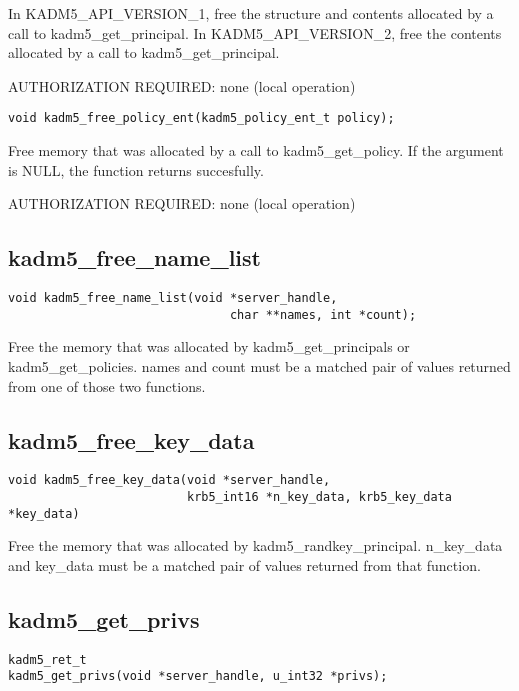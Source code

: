 In KADM5_API_VERSION_1, free the structure and contents allocated by a
call to kadm5_get_principal.  In KADM5_API_VERSION_2, free the
contents allocated by a call to kadm5_get_principal.

AUTHORIZATION REQUIRED: none (local operation)

\begin{verbatim}
void kadm5_free_policy_ent(kadm5_policy_ent_t policy);
\end{verbatim}

Free memory that was allocated by a call to kadm5_get_policy.  If
the argument is NULL, the function returns succesfully.

AUTHORIZATION REQUIRED: none (local operation)

\subsection{kadm5_free_name_list}

\begin{verbatim}
void kadm5_free_name_list(void *server_handle,
                               char **names, int *count);
\end{verbatim}

Free the memory that was allocated by kadm5_get_principals or
kadm5_get_policies.  names and count must be a matched pair of
values returned from one of those two functions.

\subsection{kadm5_free_key_data}

\begin{verbatim}
void kadm5_free_key_data(void *server_handle,
                         krb5_int16 *n_key_data, krb5_key_data *key_data)
\end{verbatim}

Free the memory that was allocated by kadm5_randkey_principal.
n_key_data and key_data must be a matched pair of values returned from
that function.

\subsection{kadm5_get_privs}

\begin{verbatim}
kadm5_ret_t
kadm5_get_privs(void *server_handle, u_int32 *privs);
\end{verbatim}

